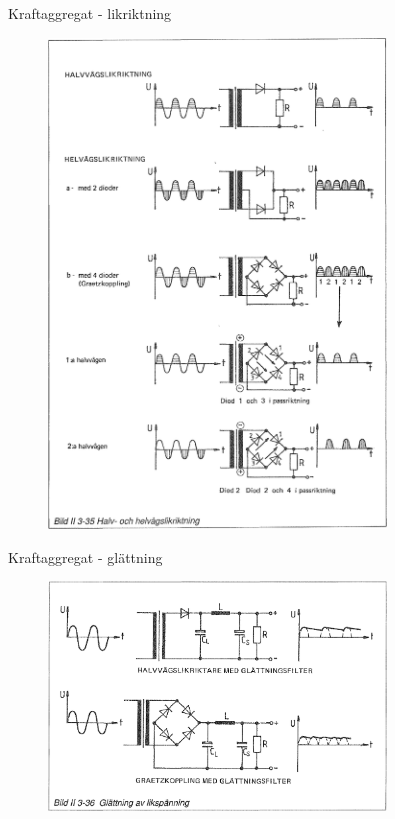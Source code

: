 \documentclass{beamer}
\begin{document}
\begin{frame}{Kraftaggregat - likriktning}

\begin{figure}[h]
\includegraphics[width=0.8\textwidth]{images/bild_2_3-35}
\label{fig:BildII1-16}
\end{figure}
\end{frame}

\begin{frame}{Kraftaggregat - glättning}

\begin{figure}[h]
\includegraphics[width=0.8\textwidth]{images/bild_2_3-36}
\label{fig:BildII1-16}
\end{figure}
\end{frame}
\end{document}
